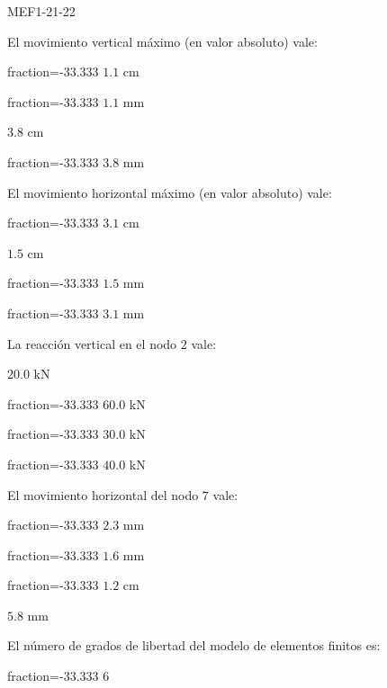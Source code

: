\documentclass[a4paper]{article}
\begin{document}
	
\begin{quiz}{MEF1-21-22}

\begin{multi}{}
El movimiento vertical m\'aximo (en valor absoluto) vale:
	\item[fraction=-33.333] $1.1$ cm
	\item[fraction=-33.333] $1.1$ mm
	\item* $3.8$ cm
	\item[fraction=-33.333] $3.8$ mm
\end{multi}
\begin{multi}{}
	El movimiento horizontal m\'aximo (en valor absoluto) vale:
	\item[fraction=-33.333]  $3.1$ cm
	\item* $1.5$ cm
	\item[fraction=-33.333]  $1.5$ mm
	\item[fraction=-33.333]  $3.1$ mm
\end{multi}
\begin{multi}{}
	La reacci\'on vertical en el nodo $2$ vale:
	\item* $20.0$ kN
	\item[fraction=-33.333] $60.0$ kN
	\item[fraction=-33.333] $30.0$ kN
	\item[fraction=-33.333] $40.0$ kN
\end{multi}
\begin{multi}{}
El movimiento horizontal del nodo $7$ vale:
	\item[fraction=-33.333] $2.3$ mm
	\item[fraction=-33.333] $1.6$ mm
	\item[fraction=-33.333] $1.2$ cm
	\item* $5.8$ mm
\end{multi}
\begin{multi}{}
El n\'umero de grados de libertad del modelo de elementos finitos es:
	\item[fraction=-33.333] $6$

\end{multi}
\end{quiz}
\end{document}
